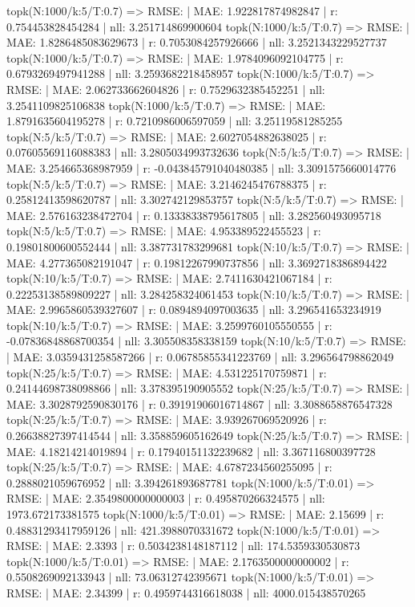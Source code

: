 topk(N:1000/k:5/T:0.7) => RMSE: | MAE: 1.922817874982847 | r: 0.754453828454284 | nll: 3.251714869900604
topk(N:1000/k:5/T:0.7) => RMSE: | MAE: 1.8286485083629673 | r: 0.7053084257926666 | nll: 3.2521343229527737
topk(N:1000/k:5/T:0.7) => RMSE: | MAE: 1.9784096092104775 | r: 0.6793269497941288 | nll: 3.2593682218458957
topk(N:1000/k:5/T:0.7) => RMSE: | MAE: 2.062733662604826 | r: 0.7529632385452251 | nll: 3.2541109825106838
topk(N:1000/k:5/T:0.7) => RMSE: | MAE: 1.8791635604195278 | r: 0.7210986006597059 | nll: 3.25119581285255
topk(N:5/k:5/T:0.7) => RMSE: | MAE: 2.6027054882638025 | r: 0.07605569116088383 | nll: 3.2805034993732636
topk(N:5/k:5/T:0.7) => RMSE: | MAE: 3.254665368987959 | r: -0.043845791040480385 | nll: 3.3091575660014776
topk(N:5/k:5/T:0.7) => RMSE: | MAE: 3.2146245476788375 | r: 0.25812413598620787 | nll: 3.302742129853757
topk(N:5/k:5/T:0.7) => RMSE: | MAE: 2.576163238472704 | r: 0.13338338795617805 | nll: 3.282560493095718
topk(N:5/k:5/T:0.7) => RMSE: | MAE: 4.953389522455523 | r: 0.19801800600552444 | nll: 3.387731783299681
topk(N:10/k:5/T:0.7) => RMSE: | MAE: 4.277365082191047 | r: 0.19812267990737856 | nll: 3.3692718386894422
topk(N:10/k:5/T:0.7) => RMSE: | MAE: 2.7411630421067184 | r: 0.22253138589809227 | nll: 3.284258324061453
topk(N:10/k:5/T:0.7) => RMSE: | MAE: 2.9965860539327607 | r: 0.0894894097003635 | nll: 3.296541653234919
topk(N:10/k:5/T:0.7) => RMSE: | MAE: 3.2599760105550555 | r: -0.07836848868700354 | nll: 3.305508358338159
topk(N:10/k:5/T:0.7) => RMSE: | MAE: 3.0359431258587266 | r: 0.06785855341223769 | nll: 3.296564798862049
topk(N:25/k:5/T:0.7) => RMSE: | MAE: 4.531225170759871 | r: 0.24144698738098866 | nll: 3.378395190905552
topk(N:25/k:5/T:0.7) => RMSE: | MAE: 3.3028792590830176 | r: 0.39191906016714867 | nll: 3.3088658876547328
topk(N:25/k:5/T:0.7) => RMSE: | MAE: 3.939267069520926 | r: 0.26638827397414544 | nll: 3.358859605162649
topk(N:25/k:5/T:0.7) => RMSE: | MAE: 4.18214214019894 | r: 0.17940151132239682 | nll: 3.367116800397728
topk(N:25/k:5/T:0.7) => RMSE: | MAE: 4.6787234560255095 | r: 0.2888021059676952 | nll: 3.394261893687781
topk(N:1000/k:5/T:0.01) => RMSE: | MAE: 2.3549800000000003 | r: 0.495870266324575 | nll: 1973.672173381575
topk(N:1000/k:5/T:0.01) => RMSE: | MAE: 2.15699 | r: 0.48831293417959126 | nll: 421.3988070331672
topk(N:1000/k:5/T:0.01) => RMSE: | MAE: 2.3393 | r: 0.5034238148187112 | nll: 174.5359330530873
topk(N:1000/k:5/T:0.01) => RMSE: | MAE: 2.1763500000000002 | r: 0.5508269092133943 | nll: 73.06312742395671
topk(N:1000/k:5/T:0.01) => RMSE: | MAE: 2.34399 | r: 0.4959744316618038 | nll: 4000.015438570265
